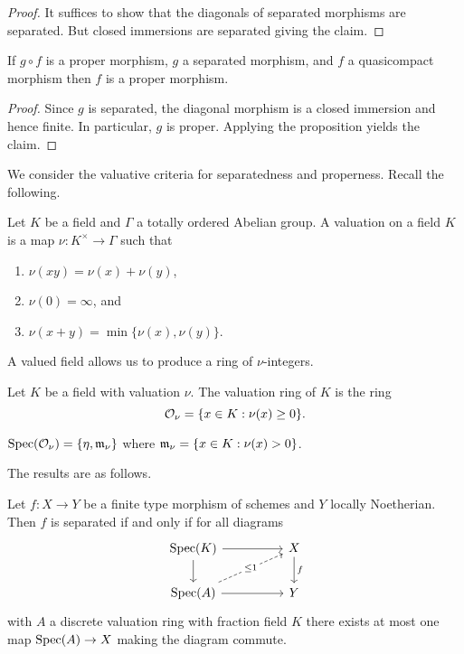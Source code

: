 \begin{proof}
    It suffices to show that the diagonals of separated morphisms are separated. But closed immersions are separated giving the claim. 
\end{proof}
\begin{corollary}\label{corr: cancellation for properness}
    If $g\circ f$ is a proper morphism, $g$ a separated morphism, and $f$ a quasicompact morphism then $f$ is a proper morphism. 
\end{corollary}
\begin{proof}
    Since $g$ is separated, the diagonal morphism is a closed immersion and hence finite. In particular, $g$ is proper. Applying the proposition yields the claim. 
\end{proof}
We consider the valuative criteria for separatedness and properness. Recall the following. 
\begin{definition}[Valuation]\label{def: valuation}
    Let $K$ be a field and $\Gamma$ a totally ordered Abelian group. A valuation on a field $K$ is a map $\nu:K^{\times}\to\Gamma$ such that 
    \begin{enumerate}[label=(\roman*)]
        \item $\nu(xy)=\nu(x)+\nu(y)$,
        \item $\nu(0)=\infty$, and
        \item $\nu(x+y)=\min\{\nu(x),\nu(y)\}$.
    \end{enumerate}
\end{definition}
A valued field allows us to produce a ring of $\nu$-integers. 
\begin{definition}\label{def: valuation ring}
    Let $K$ be a field with valuation $\nu$. The valuation ring of $K$ is the ring
    $$\mathcal{O}_{\nu}=\{x\in K:\nu(x)\geq0\}.$$
\end{definition}
\begin{remark}
    $\operatorname{Spec}(\mathcal{O}_{\nu})=\{\eta,\mathfrak{m}_{\nu}\}$ where $\mathfrak{m}_{\nu}=\{x\in K:\nu(x)>0\}$.  
\end{remark}
The results are as follows.
\begin{theorem}\label{thm: valuative criterion for separatedness}
    Let $f:X\to Y$ be a finite type morphism of schemes and $Y$ locally Noetherian. Then $f$ is separated if and only if for all diagrams 
    $$%
    \begin{tikzcd}
        {\spec(K)} && X \\
        {\spec(A)} && Y
        \arrow[from=1-1, to=1-3]
        \arrow[from=1-1, to=2-1]
        \arrow["f", from=1-3, to=2-3]
        \arrow["\leq1"{description}, dashed, from=2-1, to=1-3]
        \arrow[from=2-1, to=2-3]
    \end{tikzcd}$$
    with $A$ a discrete valuation ring with fraction field $K$ there exists at most one map $\operatorname{Spec}(A)\to X$ making the diagram commute. 
\end{theorem}
